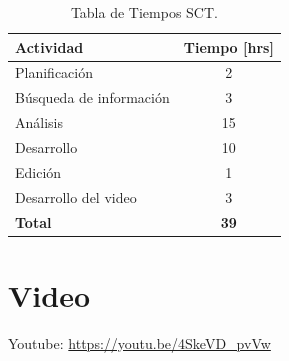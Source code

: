 \documentclass[conference]{IEEEtran}
\begin{document}
\begin{table}[H]
    \centering
    \begin{tabular}{|l|c|}
        \hline 
        \textbf{Actividad} & \textbf{Tiempo [hrs]}\\
        \hline
        Planificación & 2\\
        \hline
        Búsqueda de información & 3\\
        \hline
        Análisis & 15\\
        \hline
        Desarrollo & 10\\
        \hline
        Edición & 1\\
        \hline
        Desarrollo del video & 3\\
        \hline
        \textbf{Total} & \textbf{39}\\
        \hline
    \end{tabular}
    \label{tab:actividades} 
    \caption{Tabla de Tiempos SCT.}
\end{table}

\section{Video}

Youtube: \url{https://youtu.be/4SkeVD_pvVw}

\printbibliography
\end{document}
